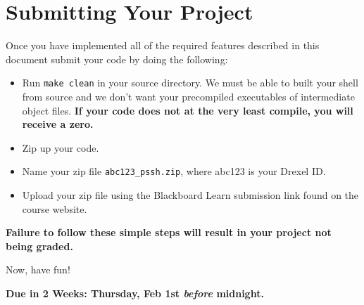 \documentclass[10pt]{article}
\begin{document}
\pagebreak

\section{Submitting Your Project}

Once you have implemented all of the required features described in this
document submit your code by doing the following:

\begin{itemize}
    \item Run \texttt{make clean} in your source directory.  We must be
        able to built your shell from source and we don't want your
        precompiled executables of intermediate object files.
        \textbf{If your code does not at the very least compile, you
        will receive a zero.}

    \item Zip up your code.

    \item Name your zip file \texttt{abc123\_pssh.zip}, where abc123 is
        your Drexel ID.

    \item Upload your zip file using the Blackboard Learn submission
        link found on the course website.
\end{itemize}

\textbf{Failure to follow these simple steps will result in your project
not being graded.}

Now, have fun!

\begin{center}
\vspace{12pt}
\textbf{Due in 2 Weeks: Thursday, Feb 1st \emph{before} midnight.}
\end{center}
\end{document}
